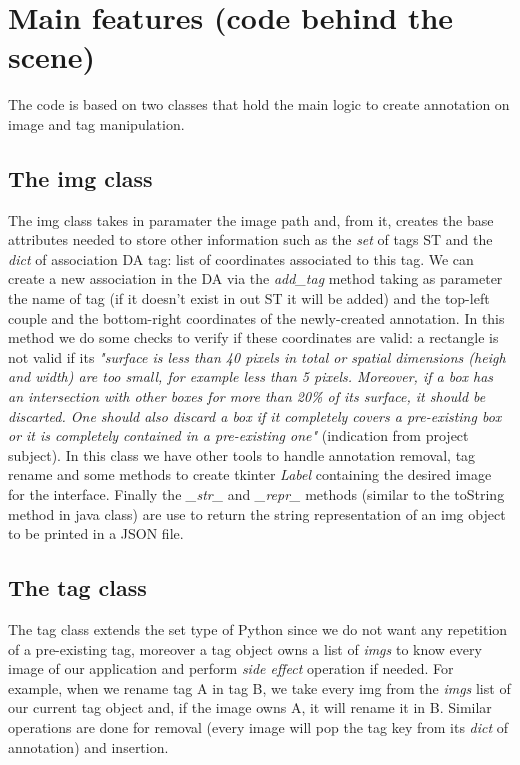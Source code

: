 \documentclass[a4paper, 11pt]{article}
\begin{document}
\section{Main features (code behind the scene)}
The code is based on two classes that hold the main logic to create annotation on image and tag manipulation.
\subsection{The img class}
The img class takes in paramater the image path and, from it, creates the base attributes needed to store other information such as the \textit{set} of tags ST and the \textit{dict} of association DA {tag: list of coordinates associated to this tag}.
We can create a new association in the DA via the \textit{add\_tag} method taking as parameter the name of tag (if it doesn't exist in out ST it will be added) and the top-left couple and the bottom-right coordinates of the newly-created annotation.
In this method we do some checks to verify if these coordinates are valid: a rectangle is not valid if its \textit{"surface is less than 40 pixels in total or spatial dimensions (heigh and width) are too small, for example less than 5 pixels. Moreover, if a box has an intersection with other boxes for more than 20\% of its surface, it should be discarted.
One should also discard a box if it completely covers a pre-existing box or it is completely contained in a pre-existing one"} (indication from project subject). 
In this class we have other tools to handle annotation removal, tag rename and some methods to create tkinter \textit{Label} containing the desired image for the interface.
Finally the \textit{\_str\_} and \textit{\_repr\_} methods (similar to the toString method in java class) are use to return the string representation of an img object to be printed in a JSON file. 
\subsection{The tag class}
The tag class extends the set type of Python since we do not want any repetition of a pre-existing tag, moreover a tag object owns a list of \textit{imgs} to know every image of our application and perform \textit{side effect} operation if needed.
For example, when we rename tag A in tag B, we take every img from the \textit{imgs} list of our current tag object and, if the image owns A, it will rename it in B. Similar operations are done for removal (every image will pop the tag key from its \textit{dict} of annotation) and insertion.  
\end{document}
